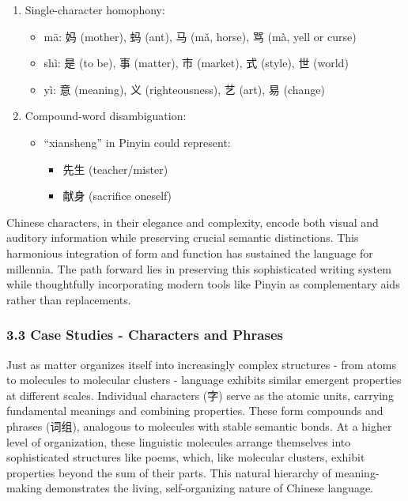 \begin{enumerate}
\def\labelenumi{\arabic{enumi}.}
\tightlist
\item
  Single-character homophony:

  \begin{itemize}
  \tightlist
  \item
    mā: 妈 (mother), 蚂 (ant), 马 (mǎ, horse), 骂 (mà, yell or curse)
  \item
    shì: 是 (to be), 事 (matter), 市 (market), 式 (style), 世 (world)
  \item
    yì: 意 (meaning), 义 (righteousness), 艺 (art), 易 (change)
  \end{itemize}
\item
  Compound-word disambiguation:

  \begin{itemize}
  \tightlist
  \item
    ``xiansheng'' in Pinyin could represent:

    \begin{itemize}
    \tightlist
    \item
      先生 (teacher/mister)
    \item
      献身 (sacrifice oneself)
    \end{itemize}
  \end{itemize}
\end{enumerate}

Chinese characters, in their elegance and complexity, encode both visual
and auditory information while preserving crucial semantic distinctions.
This harmonious integration of form and function has sustained the
language for millennia. The path forward lies in preserving this
sophisticated writing system while thoughtfully incorporating modern
tools like Pinyin as complementary aids rather than replacements.

\subsubsection{3.3 Case Studies - Characters and
Phrases}\label{case-studies---characters-and-phrases}

Just as matter organizes itself into increasingly complex structures -
from atoms to molecules to molecular clusters - language exhibits
similar emergent properties at different scales. Individual characters
(字) serve as the atomic units, carrying fundamental meanings and
combining properties. These form compounds and phrases (词组), analogous
to molecules with stable semantic bonds. At a higher level of
organization, these linguistic molecules arrange themselves into
sophisticated structures like poems, which, like molecular clusters,
exhibit properties beyond the sum of their parts. This natural hierarchy
of meaning-making demonstrates the living, self-organizing nature of
Chinese language.

